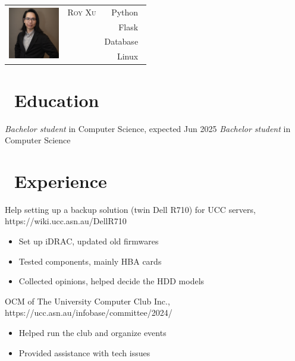\documentclass{resume}
\begin{document}

{
\Large{
  \begin{tabu}{ c l r }
    & \scshape{Roy Xu} & {Python~} \\
    &  & {Flask~} \\
    &   & {Database~}\\
    &   & {Linux~} 
  \end{tabu}
}
}

\section{\faGraduationCap\ Education}
\textit{Bachelor student} in Computer Science, expected Jun 2025
\textit{Bachelor student} in Computer Science

\section{\faUsers\ Experience}
Help setting up a backup solution (twin Dell R710) for UCC servers, https://wiki.ucc.asn.au/DellR710
\begin{itemize}
  \item Set up iDRAC, updated old firmwares
  \item Tested components, mainly HBA cards
  \item Collected opinions, helped decide the HDD models
\end{itemize}


OCM of The University Computer Club Inc., https://ucc.asn.au/infobase/committee/2024/
\begin{itemize}
  \item Helped run the club and organize events
  \item Provided assistance with tech issues
\end{itemize}
\end{document}
